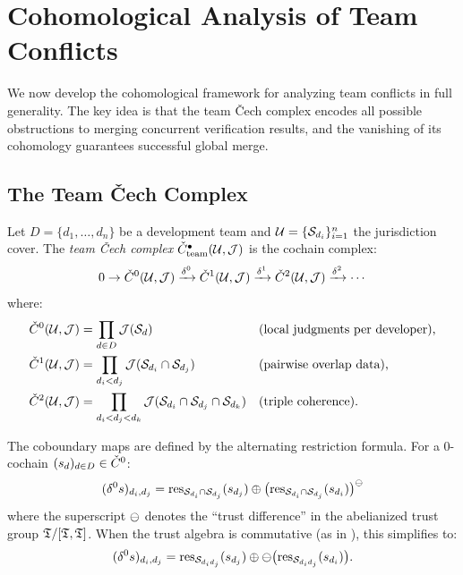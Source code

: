 \documentclass[11pt]{article}
\newcommand{\TeamCech}{\check{C}_{\mathrm{team}}}
\begin{document}
\section{Cohomological Analysis of Team Conflicts}\label{sec:cohomology}

We now develop the cohomological framework for analyzing team conflicts in
full generality. The key idea is that the team \v{C}ech complex encodes all
possible obstructions to merging concurrent verification results, and the
vanishing of its cohomology guarantees successful global merge.

\subsection{The Team \v{C}ech Complex}

\begin{definition}
Let $D = \{d_1, \ldots, d_n\}$ be a development team and
$\mathcal{U} = \{\mathcal{S}_{d_i}\}_{i=1}^n$ the jurisdiction cover.
The \emph{team \v{C}ech complex} $\TeamCech^\bullet(\mathcal{U}, \J)$ is the
cochain complex:
\[
  0 \to \check{C}^0(\mathcal{U}, \mathcal{J}) \xrightarrow{\delta^0}
  \check{C}^1(\mathcal{U}, \mathcal{J}) \xrightarrow{\delta^1}
  \check{C}^2(\mathcal{U}, \mathcal{J}) \xrightarrow{\delta^2} \cdots
\]
where:
\begin{align*}
  \check{C}^0(\mathcal{U}, \mathcal{J}) &=
    \prod_{d \in D} \mathcal{J}(\mathcal{S}_d)
    & &\text{(local judgments per developer),} \\
  \check{C}^1(\mathcal{U}, \mathcal{J}) &=
    \prod_{d_i < d_j} \mathcal{J}(\mathcal{S}_{d_i} \cap \mathcal{S}_{d_j})
    & &\text{(pairwise overlap data),} \\
  \check{C}^2(\mathcal{U}, \mathcal{J}) &=
    \prod_{d_i < d_j < d_k} \mathcal{J}(\mathcal{S}_{d_i} \cap \mathcal{S}_{d_j} \cap \mathcal{S}_{d_k})
    & &\text{(triple coherence).}
\end{align*}
\end{definition}

The coboundary maps are defined by the alternating restriction formula.
For a 0-cochain $(s_d)_{d \in D} \in \check{C}^0$:
\[
  (\delta^0 s)_{d_i, d_j} =
  \mathrm{res}_{\mathcal{S}_{d_i} \cap \mathcal{S}_{d_j}}(s_{d_j})
  \oplus \bigl(\mathrm{res}_{\mathcal{S}_{d_i} \cap \mathcal{S}_{d_j}}(s_{d_i})\bigr)^{\ominus}
\]
where the superscript $\ominus$ denotes the ``trust difference'' in the
abelianized trust group $\mathfrak{T} / [\mathfrak{T}, \mathfrak{T}]$. When the trust algebra is
commutative (as in \JuGeo), this simplifies to:
\[
  (\delta^0 s)_{d_i, d_j} =
  \mathrm{res}_{\mathcal{S}_{d_i d_j}}(s_{d_j}) \oplus
  \ominus\bigl(\mathrm{res}_{\mathcal{S}_{d_i d_j}}(s_{d_i})\bigr).
\]
\end{document}
